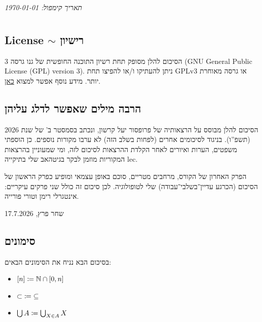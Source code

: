 \documentclass[name=רשימות חדו''א 2א]{../../../tex/classes/noChapterMegasumPreamble}
\author{שחר פרץ}
\title{\name}
\date{2026 סמסטר ב'}
\begin{document}
	\renewcommand{\footrule}{\rule{\linewidth-19pt}{0.25pt}\vspace{-5pt}}
	\newpage
	
	\hfil \textit{תאריך קימפול: \today}

	\setcounter{section}{-1}	
\section[מבוא למבוא]{}
\subsection[רישיון]{License $\sim$ רישיון}
	
	הסיכום להלן מסופק תחת רשיון התוכנה החופשית של גנו גרסה 3 (GNU General Public License (GPL) version 3). ניתן להעתיקו ו/או להפיצו תחת GPLv3 או גרסה מאוחרת יותר. מידע נוסף אפשר למצוא \href{https://www.gnu.org/licenses}{כאן}. 
	
\subsection{הרבה מילים שאפשר לדלג עליהן}
	הסיכום להלן מבוסס על הרצאותיה של פרופסור יעל קרשון, ונכתב בסמסטר ב' של שנת 2026 (תשפ''ו). בניגוד לסיכומים אחרים (לפחות בשלב הזה) לא ערבו מקורות נוספים. כן הוספתי משפטים, הערות ואיורים לאחר הקלדת ההרצאות לסיכום לזה, ומי שמעוניין בהרצאות המקוריות מוזמן לבקר בגיטהאב שלי בתיקייה lec. 
	
	הפרק האחרון של הקורס, מרחבים מטריים, סוכם באופן עצמאי ומופיע כפרק הראשון של הסיכום (הכרגע עדיין־בשלבי־עבודה) שלי לטופולוגיה. לכן סיכום זה כולל שני פרקים עיקריים: אינטגרלי רימן וטורי פורייה. 
	
	\hfill שחר פרץ, 17.7.2026
	
	
\subsection{סימונים}
	בסיכום הבא נניח את הסימונים הבאים: 
	\begin{itemize}
		\item \hfil $[n] \coloneqq \mathbb{N} \cap [0, n]$
		\item \hfil $\subset \; \coloneqq \; \subseteq$
		\item \hfil $\bigcup A \coloneqq \bigcup_{X \in A}X$
	\end{itemize}
	
\end{document}
